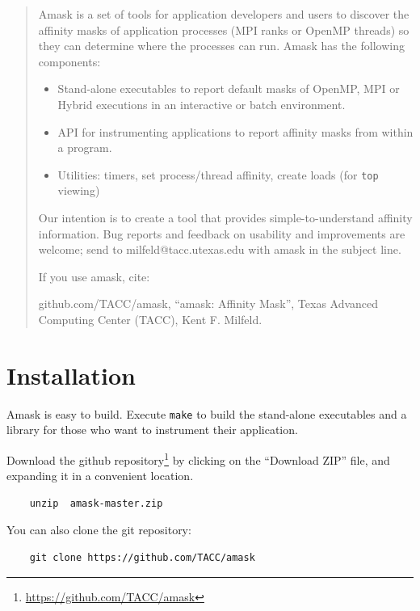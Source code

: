 \documentclass[10pt,a4paper]{report}
\begin{document}
\begin{abstract}

Amask is a set of tools for application developers and users to discover the affinity masks of application
processes (MPI ranks or OpenMP threads) so they can determine where the processes can run.
Amask has the following components:

\begin{itemize}
\item Stand-alone executables to report default masks of OpenMP, 
      MPI or Hybrid executions in an interactive or batch environment.
\item API for instrumenting applications to report affinity masks from within a program.
\item Utilities: timers, set process/thread affinity, create loads (for \verb+top+ viewing)
\end{itemize}


Our intention is to create a tool that provides simple-to-understand affinity
information. Bug reports and feedback on usability and improvements are welcome; 
send to milfeld@tacc.utexas.edu with amask in the subject line. 


If you use amask, cite:

github.com/TACC/amask, ``amask: Affinity Mask'', 
Texas Advanced Computing Center (TACC), Kent F. Milfeld. \cite{amask}

\end{abstract}

\tableofcontents

\chapter{Installation}
Amask is easy to build. Execute \verb+make+  to build the stand-alone executables 
and a library for those who want to instrument their application.

Download the github repository\footnote{\href{https://github.com/TACC/amask}
{https://github.com/TACC/amask}} by clicking on the ``Download ZIP'' file, 
and expanding it in a convenient location.

\begin{verbatim}
    unzip  amask-master.zip
\end{verbatim}

You can also clone the git repository:

\begin{verbatim}
    git clone https://github.com/TACC/amask
\end{verbatim}
\end{document}

